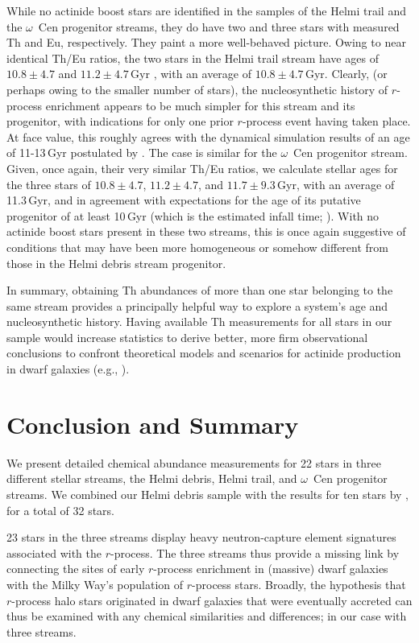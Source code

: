 \documentclass[twocolumn]{aastex63}
\begin{document}
While no actinide boost stars are identified in the samples of the Helmi trail and the $\omega$~Cen progenitor streams, they do have two and three stars with measured Th and Eu, respectively. They paint a more well-behaved picture. Owing to near identical Th/Eu ratios, the two stars in the Helmi trail stream have ages of $10.8 \pm 4.7$ and $11.2 \pm 4.7$\,Gyr \citep{Schatz02}, with an average of $10.8 \pm 4.7$\,Gyr.  Clearly, (or perhaps owing to the smaller number of stars), the nucleosynthetic history of $r$-process enrichment appears to be much simpler for this stream and its progenitor, with indications for only one prior $r$-process event having taken place. At face value, this roughly agrees with the dynamical simulation results of an age of 11-13\,Gyr postulated by \citet{koppelman19}. 
The case is similar for the $\omega$~Cen progenitor stream. Given, once again, their very similar Th/Eu ratios, we calculate stellar ages for the three stars of $10.8\pm 4.7$, $11.2\pm 4.7$, and $11.7\pm 9.3$\,Gyr, with an average of 11.3\,Gyr, and in agreement with expectations for the age of its putative progenitor of at least 10\,Gyr (which is the estimated infall time; \citealt{bekki03}). With no actinide boost stars present in these two streams, this is once again suggestive of conditions that may have been more homogeneous or somehow different from those in the Helmi debris stream progenitor. 

 
In summary, obtaining Th abundances of more than one star belonging to the same stream provides a principally helpful way to explore a system's age and nucleosynthetic history. Having available Th measurements for all stars in our sample would increase statistics to derive better, more firm observational conclusions to confront theoretical models and scenarios for actinide production in dwarf galaxies (e.g., \citealt{holmbeck19}).




\section{Conclusion and Summary}\label{concl}

We present detailed chemical abundance measurements for 22 stars in three different stellar streams, the Helmi debris, Helmi trail, and $\omega$~Cen progenitor streams. We combined our Helmi debris sample with the results for ten stars by \citet{Roederer10}, for a total of 32 stars.

23 stars in the three streams display heavy neutron-capture element signatures associated with the $r$-process. The three streams thus provide a missing link by connecting the sites of early $r$-process enrichment in (massive) dwarf galaxies with the Milky Way's population of $r$-process stars. Broadly, the hypothesis that $r$-process halo stars originated in dwarf galaxies that were eventually accreted can thus be examined with any chemical similarities and differences; in our case with three streams. 
\end{document}
